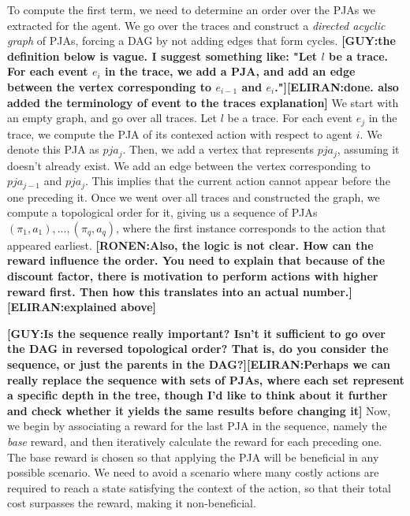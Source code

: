 \documentclass[letterpaper]{article} %
\newcommand{\eliran}[1]{\textbf{[\color{red}ELIRAN:#1]}}
\newcommand{\ronen}[1]{\textbf{[\color{blue}RONEN:#1]}}
\newcommand{\guy}[1]{\textbf{[\color{orange}GUY:#1]}}
\begin{document}
To compute the first term, we need to determine an order over the PJAs we extracted for the agent.
We go over the traces and construct a \emph{directed acyclic graph} of PJAs, forcing a DAG by not adding edges that form cycles.
\guy{the definition below is vague. I suggest something like: "Let $l$ be a trace. For each event $e_i$ in the trace, we add a PJA, and add an edge between the vertex corresponding to $e_{i-1}$ and $e_i$."}\eliran{done. also added the terminology of event to the traces explanation}
We start with an empty graph, and go over all traces. Let $l$ be a trace. For each event $e_j$ in the trace, we compute the PJA of its contexed action with respect to agent $i$. We denote this PJA as $pja_j$.
Then, we add a vertex that represents $pja_j$, assuming it doesn't already exist. We add an edge between the vertex corresponding to $pja_{j-1}$ and $pja_j$.
This implies that the current action cannot appear before the one preceding it.
Once we went over all traces and constructed the graph, we compute a topological order
for it, giving us a sequence of PJAs $(\pi_1, a_1),..., (\pi_q, a_q)$, where the first instance corresponds to the action that appeared earliest.
\ronen{Also, the logic is not clear. How can the reward influence the order. You need to explain that because of the discount factor, there is motivation to perform actions with higher reward first.
Then how this translates into an actual number.}
\eliran{explained above}

\guy{Is the sequence really important? Isn't it sufficient to go over the DAG in reversed topological order? That is, do you consider the sequence, or just the parents in the DAG?}\eliran{Perhaps we can really replace the sequence with sets of PJAs, where each set represent a specific depth in the tree, though I'd like to think about it further and check whether it yields the same results before changing it}
Now, we begin by associating a reward for the last PJA in the sequence, namely the \emph{base} reward, and then iteratively calculate the reward for each preceding one.
The base reward is chosen so that applying the PJA will be beneficial in any possible scenario. We need to avoid a scenario where many costly actions are required to reach a state satisfying the context of the action, so that their total cost surpasses the reward, making it non-beneficial.
\end{document}
